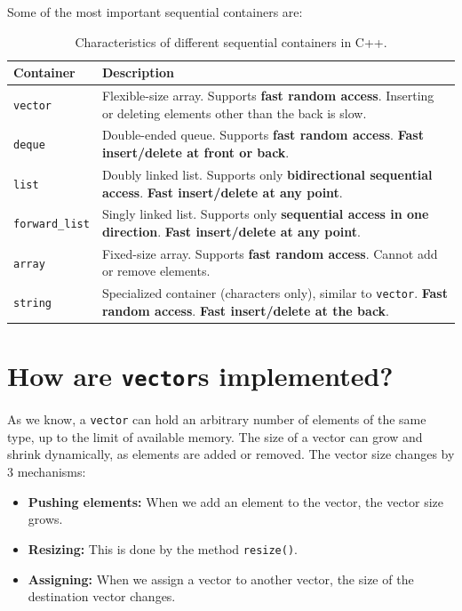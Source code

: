 Some of the most important sequential containers are:

\begin{table}[H]
    \centering
    \begin{tabular}{|l|p{10cm}|}
    \hline
    \textbf{Container} & \textbf{Description} \\ \hline
    \texttt{vector} & Flexible-size array. Supports \textbf{fast random access}. Inserting or deleting elements other than the back is slow. \\ \hline
    \texttt{deque} & Double-ended queue. Supports \textbf{fast random access}. \textbf{Fast insert/delete at front or back}. \\ \hline
    \texttt{list} & Doubly linked list. Supports only \textbf{bidirectional sequential access}. \textbf{Fast insert/delete at any point}. \\ \hline
    \texttt{forward\_list} & Singly linked list. Supports only \textbf{sequential access in one direction}. \textbf{Fast insert/delete at any point}. \\ \hline
    \texttt{array} & Fixed-size array. Supports \textbf{fast random access}. Cannot add or remove elements. \\ \hline
    \texttt{string} & Specialized container (characters only), similar to \texttt{vector}. \textbf{Fast random access}. \textbf{Fast insert/delete at the back}. \\ \hline
    \end{tabular}
    \caption{Characteristics of different sequential containers in C++.}
    \label{table:containers}
\end{table}

\section{How are \texttt{vector}s implemented?}

As we know, a \texttt{vector} can hold an arbitrary number of elements of the same type, up to
the limit of available memory. The size of a vector can grow and shrink dynamically, as elements
are added or removed. The vector size changes by 3 mechanisms:

\begin{itemize}
    \item \textbf{Pushing elements:} When we add an element to the vector, the vector size grows.
    \item \textbf{Resizing:} This is done by the method \texttt{resize()}.
    \item \textbf{Assigning:} When we assign a vector to another vector, the size of the destination
    vector changes.
\end{itemize}

